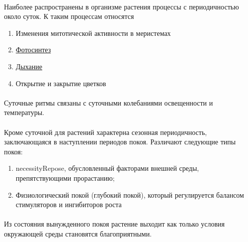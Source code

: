 \paragraph*{}Наиболее распространены в организме растения процессы с периодичностью около суток. К таким процессам относятся 

\begin{enumerate}
\item Изменения митотической активности в меристемах
\item \hyperlink{photosyntesis}{Фотосинтез}
\item \hyperlink{sect_breazing}{Дыхание}
\item Открытие и закрытие цветков
\end{enumerate}

\paragraph*{}Суточные ритмы связаны с суточными колебаниями освещенности и температуры. 

\paragraph*{}Кроме суточной для растений характерна сезонная периодичность, заключающаяся в наступлении периодов покоя. Различают следующие типы покоя:

\begin{enumerate}
\item \gls{necessityRepose}, обусловленный факторами внешней среды, препятствующими прорастанию;
\item Физиологический покой (глубокий покой), который регулируется балансом стимуляторов и ингибиторов роста
\end{enumerate}


\paragraph*{}Из состояния вынужденного покоя растение выходит как только условия окружающей среды становятся благоприятными.

